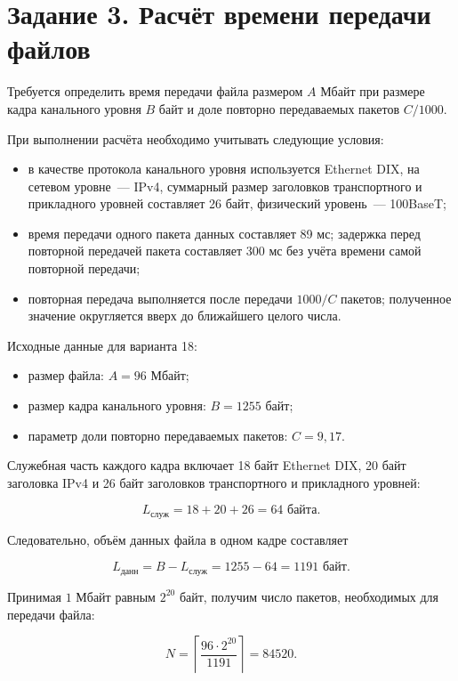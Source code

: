 \newpage
\section{Задание 3. Расчёт времени передачи файлов}

Требуется определить время передачи файла размером $A$ Мбайт при размере
кадра канального уровня $B$ байт и доле повторно передаваемых пакетов
$C/1000$.

При выполнении расчёта необходимо учитывать следующие условия:

\begin{itemize}
	\item в качестве протокола канального уровня используется Ethernet DIX,
	на сетевом уровне~--- IPv4, суммарный размер заголовков транспортного и
	прикладного уровней составляет 26 байт, физический уровень~--- 100BaseT;

	\item время передачи одного пакета данных составляет 89 мс; задержка перед
	повторной передачей пакета составляет 300 мс без учёта времени самой
	повторной передачи;

	\item повторная передача выполняется после передачи $1000/C$ пакетов;
	полученное значение округляется вверх до ближайшего целого числа.
\end{itemize}

Исходные данные для варианта 18:

\begin{itemize}
	\item размер файла: $A = 96$ Мбайт;
	\item размер кадра канального уровня: $B = 1255$ байт;
	\item параметр доли повторно передаваемых пакетов: $C = 9{,}17$.
\end{itemize}

Служебная часть каждого кадра включает 18 байт Ethernet DIX, 20 байт
заголовка IPv4 и 26 байт заголовков транспортного и прикладного уровней:

\[
	L_{\text{служ}} = 18 + 20 + 26 = 64\text{ байта}.
\]

Следовательно, объём данных файла в одном кадре составляет

\[
	L_{\text{данн}} = B - L_{\text{служ}} = 1255 - 64 = 1191\text{ байт}.
\]

Принимая $1$ Мбайт равным $2^{20}$ байт, получим число пакетов, необходимых
для передачи файла:

\[
	N = \left\lceil\frac{96 \cdot 2^{20}}{1191}\right\rceil
	= 84520.
\]

